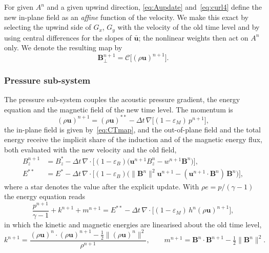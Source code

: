 \documentclass[a4paper,fleqn]{cas-sc}
\theoremstyle{remark}
\newcommand{\eps}{\varepsilon}
\newcommand{\epsM}{\eps_{M}}
\newcommand{\epsB}{\eps_{B}}
\newcommand{\Bb}{\mathbf{B}}
\newcommand{\half}{\tfrac{1}{2}}
\begin{document}
For given $A^{n}$ and a given upwind direction, \eqref{eq:Aupdate}
and~\eqref{eq:curl4} define the new in-plane field as an \emph{affine} function
of the velocity. We make this exact by selecting the upwind side of $G_x$, $G_y$
with the velocity of the old time level and by using central differences for the
slopes of $\bar{\mathbf{u}}$; the nonlinear weights then act on $A^{n}$ only. We
denote the resulting map by
\begin{equation}
\label{eq:CTmap}
\Bb_\perp^{n+1}=\mathcal C\big[(\rho\mathbf{u})^{n+1}\big].
\end{equation}

\subsubsection{Pressure sub-system}
\label{sec:pressure}
The pressure sub-system couples the acoustic pressure gradient, the energy
equation and the magnetic field of the new time level. The momentum is
\begin{equation}
\label{eq:p_mom}
(\rho\mathbf{u})^{n+1}=(\rho\mathbf{u})^{\ast\ast}-\Delta t\,\nabla\big[(1-\epsM)\,p^{n+1}\big],
\end{equation}
the in-plane field is given by~\eqref{eq:CTmap}, and the out-of-plane field and
the total energy receive the implicit share of the induction and of the magnetic
energy flux, both evaluated with the new velocity and the old field,
\begin{align}
\label{eq:Bz}
B_z^{n+1}&=B_z^{\ast}-\Delta t\,\nabla\!\cdot\!\big[(1-\epsB)\big(\mathbf{u}^{n+1}B_z^{n}-w^{n+1}\Bb^{n}\big)\big],\\
\label{eq:Umag}
E^{\ast\ast}&=E^{\ast}-\Delta t\,\nabla\!\cdot\!\big[(1-\epsB)\big(\|\Bb^{n}\|^{2}\mathbf{u}^{n+1}
-(\mathbf{u}^{n+1}\!\cdot\Bb^{n})\,\Bb^{n}\big)\big],
\end{align}
where a star denotes the value after the explicit update. With
$\rho e=p/(\gamma-1)$ the energy equation reads
\begin{equation}
\label{eq:energy_imp}
\frac{p^{n+1}}{\gamma-1}+k^{n+1}+m^{n+1}
=E^{\ast\ast}-\Delta t\,\nabla\!\cdot\!\big[(1-\epsM)\,h^{n}(\rho\mathbf{u})^{n+1}\big],
\end{equation}
in which the kinetic and magnetic energies are linearised about the old time
level,
\begin{equation}
\label{eq:klin}
k^{n+1}=\frac{(\rho\mathbf{u})^{n}\!\cdot\!(\rho\mathbf{u})^{n+1}-\half\|(\rho\mathbf{u})^{n}\|^{2}}{\rho^{n+1}},
\qquad
m^{n+1}=\Bb^{n}\!\cdot\!\Bb^{n+1}-\half\|\Bb^{n}\|^{2}.
\end{equation}
\end{document}
